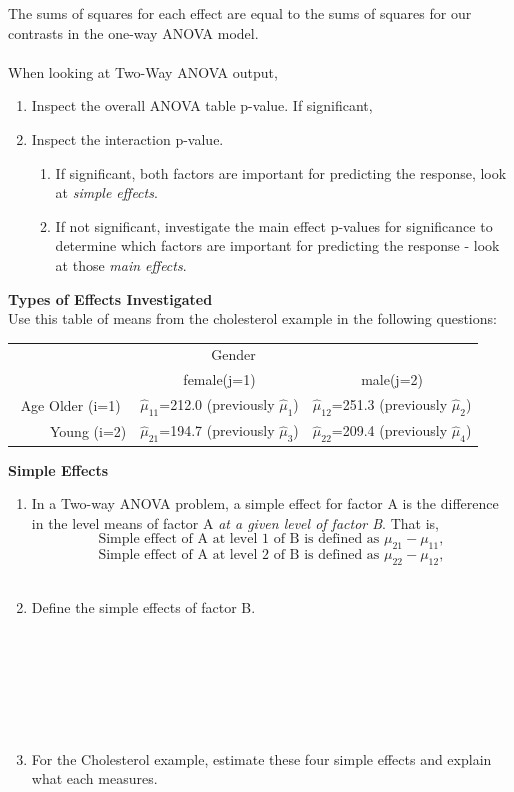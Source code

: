 The sums of squares for each effect are equal to the sums of squares for our contrasts in the one-way ANOVA model.\\~\\
When looking at Two-Way ANOVA output,
\begin{enumerate}
\item Inspect the overall ANOVA table p-value.  If significant,
\item Inspect the interaction p-value.  
\begin{enumerate}
\item If significant, both factors are important for predicting the response, look at \textit{simple effects}.
\item If not significant, investigate the main effect p-values for significance to determine which factors are important for predicting the response - look at those \textit{main effects}.
\end{enumerate}
\end{enumerate}

\newpage


\Large\textbf{Types of Effects Investigated}\large\\
Use this table of means from the cholesterol example in the following questions:
\begin{center}
\begin{tabular}{c|cc}
&~~~~Gender\\
&female(j=1) &male(j=2)\\\hline
Age Older (i=1) & $\hat{\mu}_{11}$=212.0 (previously $\hat{\mu}_{1}$)& $\hat{\mu}_{12}$=251.3 (previously $\hat{\mu}_{2}$)\\
~~~~~Young (i=2) & $\hat{\mu}_{21}$=194.7 (previously $\hat{\mu}_{3}$)& $\hat{\mu}_{22}$=209.4 (previously $\hat{\mu}_{4}$)
\end{tabular}
\end{center}

\textbf{Simple Effects}
\begin{enumerate}
\item In a Two-way ANOVA problem, a simple effect for factor A is the difference in the level means of factor A \textit{at a given level of factor B}.  That is,\\
$$\text{Simple effect of A at level }1\text{ of B is defined as }\mu_{21}-\mu_{11},$$ 
$$\text{Simple effect of A at level }2\text{ of B is defined as }\mu_{22}-\mu_{12},$$ ~\\
\item Define the simple effects of factor B.\\~\\~\\~\\~\\~\\~\\
\item For the Cholesterol example, estimate these four simple effects and explain what each measures.
\end{enumerate}

